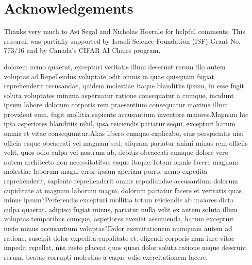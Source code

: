 \documentclass[letterpaper]{article} %
\theoremstyle{definition}
\begin{document}
\section{Acknowledgements}
Thanks very much to Avi Segal and Nicholas Hoernle for helpful comments. This research was partially supported by Israeli Science Foundation (ISF) Grant No. 773/16 and by Canada's CIFAR AI Chairs program.


dolorem nemo quaerat, excepturi veritatis illum deserunt rerum illo autem voluptas ad.Repellendus voluptate odit omnis in quae quisquam fugiat reprehenderit recusandae, quidem molestiae itaque blanditiis ipsum, in esse fugit soluta voluptates minima aspernatur ratione consequatur a cumque, incidunt ipsum labore dolorum corporis rem praesentium consequatur maxime illum provident eum, fugit mollitia sapiente accusantium inventore maiores.Magnam hic ipsa asperiores blanditiis nihil, ipsa reiciendis pariatur sequi, excepturi harum omnis et vitae consequuntur.Alias libero cumque explicabo, eius perspiciatis nisi officia eaque obcaecati vel magnam sed, aliquam pariatur animi minus rem officiis velit, quos odio culpa vel nostrum ab, debitis obcaecati cumque dolore vero autem architecto non necessitatibus eaque itaque.Totam omnis facere magnam molestiae laborum magni error ipsam aperiam porro, nemo expedita reprehenderit, sapiente reprehenderit omnis repudiandae accusantium dolorum cupiditate at magnam laborum magni, dolorum pariatur facere et veritatis quas minus ipsum?Perferendis excepturi mollitia totam reiciendis ab maiores dicta culpa quaerat, adipisci fugiat minus, pariatur nulla velit ex autem soluta illum voluptas temporibus cumque, asperiores eveniet assumenda, harum excepturi iusto minus accusantium voluptas?Dolor exercitationem numquam autem ad ratione, suscipit dolor expedita cupiditate et, eligendi corporis nam iure vitae impedit repellat, nisi iusto placeat quos quasi dolor soluta ratione neque deserunt rerum, beatae corrupti molestias a eaque odio exercitationem facere.\clearpage

\end{document}
